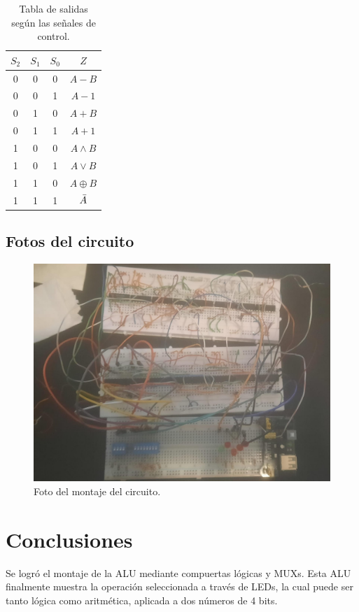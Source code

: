 \documentclass[journal, table]{IEEEtran}
\begin{document}
\begin{table}[htbp!]
    \centering
    \begin{tabular}{c|c|c||c}
    \toprule
        $S_2$ & $S_1$ & $S_0$ & $Z$ \\
        \midrule
        0 & 0 & 0 & $A - B$ \\
        0 & 0 & 1 & $A - 1$ \\
        0 & 1 & 0 & $A + B$ \\
        0 & 1 & 1 & $A + 1$ \\
        1 & 0 & 0 & $A \land B$ \\
        1 & 0 & 1 & $A \lor B$ \\
        1 & 1 & 0 & $A \oplus B$ \\
        1 & 1 & 1 & $\Bar{A}$ \\
        \bottomrule
    \end{tabular}
    \caption{Tabla de salidas según las señales de control.}
    \label{tab:Zvalue}
\end{table}

\subsection{Fotos del circuito}
\begin{figure}[h]
    \centering
    \includegraphics[width=\linewidth]{./Images/WhatsApp Image 2024-05-11 at 18.46.47.jpeg}
    \caption{Foto del montaje del circuito.}
    \label{fig:photo}
\end{figure}

\section{Conclusiones}
Se logró el montaje de la ALU mediante compuertas lógicas y MUXs. Esta ALU finalmente muestra la operación seleccionada a través de LEDs, la cual puede ser tanto lógica como aritmética, aplicada a dos números de 4 bits.

\printbibliography
\nocite{*}
\end{document}
